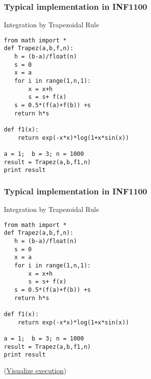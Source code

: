 \documentclass{beamer}
\begin{document}
\begin{frame}
\frametitle{Typical implementation in INF1100}

\begin{block}{Integration by Trapezoidal Rule  }

\begin{verbatim}
from math import *
def Trapez(a,b,f,n):
   h = (b-a)/float(n)
   s = 0
   x = a
   for i in range(1,n,1):
       x = x+h
       s = s+ f(x)
   s = 0.5*(f(a)+f(b)) +s
   return h*s

def f1(x):
    return exp(-x*x)*log(1+x*sin(x))

a = 1;  b = 3; n = 1000
result = Trapez(a,b,f1,n)
print result
\end{verbatim}
\end{block}
\end{frame}

\begin{frame}
\frametitle{Typical implementation in INF1100}

\begin{block}{Integration by Trapezoidal Rule  }

\begin{verbatim}
from math import *
def Trapez(a,b,f,n):
   h = (b-a)/float(n)
   s = 0
   x = a
   for i in range(1,n,1):
       x = x+h
       s = s+ f(x)
   s = 0.5*(f(a)+f(b)) +s
   return h*s

def f1(x):
    return exp(-x*x)*log(1+x*sin(x))

a = 1;  b = 3; n = 1000
result = Trapez(a,b,f1,n)
print result
\end{verbatim}
\noindent
(\href{{http://pythontutor.com/visualize.html\#code=from+math+import+\%2A\%0Adef+Trapez\%28a\%2Cb\%2Cf\%2Cn\%29\%3A\%0A+++h+\%3D+\%28b-a\%29\%2Ffloat\%28n\%29\%0A+++s+\%3D+0\%0A+++x+\%3D+a\%0A+++for+i+in+range\%281\%2Cn\%2C1\%29\%3A\%0A+++++++x+\%3D+x\%2Bh\%0A+++++++s+\%3D+s\%2B+f\%28x\%29\%0A+++s+\%3D+0.5\%2A\%28f\%28a\%29\%2Bf\%28b\%29\%29+\%2Bs\%0A+++return+h\%2As\%0A\%0Adef+f1\%28x\%29\%3A\%0A++++return+exp\%28-x\%2Ax\%29\%2Alog\%281\%2Bx\%2Asin\%28x\%29\%29\%0A\%0Aa+\%3D+1\%3B++b+\%3D+3\%3B+n+\%3D+1000\%0Aresult+\%3D+Trapez\%28a\%2Cb\%2Cf1\%2Cn\%29\%0Aprint+result&mode=display&cumulative=false&heapPrimitives=false&drawParentPointers=false&textReferences=false&py=2&curInstr=0}}{Visualize execution}) 

\end{block}
\end{frame}
\end{document}
